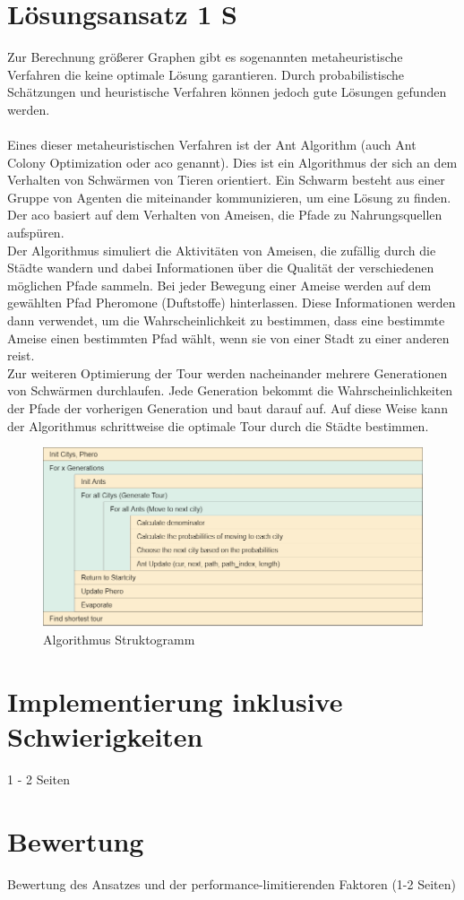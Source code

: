 \section{Lösungsansatz 1 S}

Zur Berechnung größerer Graphen gibt es sogenannten metaheuristische Verfahren die keine optimale Lösung garantieren.
Durch probabilistische Schätzungen und heuristische Verfahren können jedoch gute Lösungen gefunden werden.
\\\\
Eines dieser metaheuristischen Verfahren ist der Ant Algorithm (auch \glqq Ant Colony Optimization\grqq{} oder \glqq \acs{aco}\grqq{} genannt).
Dies ist ein Algorithmus der sich an dem Verhalten von Schwärmen von Tieren orientiert.
Ein Schwarm besteht aus einer Gruppe von \glqq Agenten\grqq{} die miteinander kommunizieren, um eine Lösung zu finden.
Der \acs{aco} basiert auf dem Verhalten von Ameisen, die Pfade zu Nahrungsquellen aufspüren.
\\
Der Algorithmus simuliert die Aktivitäten von Ameisen, die zufällig durch die Städte wandern und dabei Informationen über die Qualität der verschiedenen möglichen Pfade sammeln.
Bei jeder Bewegung einer Ameise werden auf dem gewählten Pfad Pheromone (Duftstoffe) hinterlassen.
Diese Informationen werden dann verwendet, um die Wahrscheinlichkeit zu bestimmen, dass eine bestimmte Ameise einen bestimmten Pfad wählt, wenn sie von einer Stadt zu einer anderen reist. 
\\
Zur weiteren Optimierung der Tour werden nacheinander mehrere Generationen von Schwärmen durchlaufen.
Jede Generation bekommt die Wahrscheinlichkeiten der Pfade der vorherigen Generation und baut darauf auf.
Auf diese Weise kann der Algorithmus schrittweise die optimale Tour durch die Städte bestimmen.

\begin{figure}[H]
    \centering
    \includegraphics[width=16cm]{../images/struktog.png}
    \caption{Algorithmus Struktogramm}
    \label{fig:struktogramm}
\end{figure}

\section{Implementierung inklusive Schwierigkeiten}
1 - 2 Seiten

\section{Bewertung}
Bewertung des Ansatzes und der performance-limitierenden Faktoren (1-2 Seiten)
